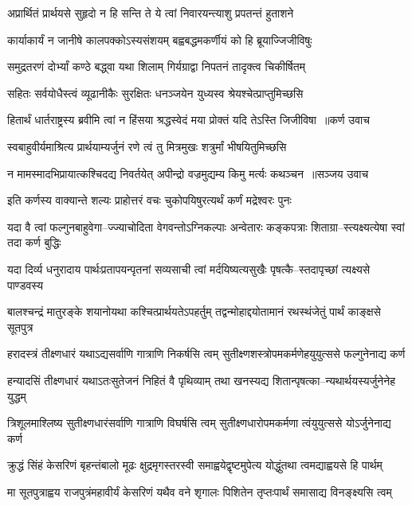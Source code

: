 \twolineshloka
{अप्रार्थितं प्रार्थयसे सुहृदो न हि सन्ति ते}
{ये त्वां निवारयन्त्याशु प्रपतन्तं हुताशने}


\twolineshloka
{कार्याकार्यं न जानीषे कालपक्कोऽस्यसंशयम्}
{बह्वबद्धमकर्णीयं को हि ब्रूयाज्जिजीविषुः}


\twolineshloka
{समुद्रतरणं दोर्भ्यां कण्ठे बद्ध्वा यथा शिलाम्}
{गिर्यग्राद्वा निपतनं तादृक्त्व चिकीर्षितम्}


\twolineshloka
{सहितः सर्वयोधैस्त्वं व्यूढानीकैः सुरक्षितः}
{धनञ्जयेन युध्यस्व श्रेयश्चेत्प्राप्तुमिच्छसि}


\threelineshloka
{हितार्थं धार्तराष्ट्रस्य ब्रवीमि त्वां न हिंसया}
{श्रद्धस्वेदं मया प्रोक्तं यदि तेऽस्ति जिजीविषा ॥कर्ण उवाच}
{}


\twolineshloka
{स्वबाहुवीर्यमाश्रित्य प्रार्थयाम्यर्जुनं रणे}
{त्वं तु मित्रमुखः शत्रुर्मां भीषयितुमिच्छसि}


\threelineshloka
{न मामस्मादभिप्रायात्कश्चिदद्य निवर्तयेत्}
{अपीन्द्रो वज्रमुद्यम्य किमु मर्त्यः कथञ्चन ॥सञ्जय उवाच}
{}


\twolineshloka
{इति कर्णस्य वाक्यान्ते शल्यः प्राहोत्तरं वचः}
{चुकोपयिषुरत्यर्थं कर्णं मद्रेश्वरः पुनः}


\twolineshloka
{यदा वै त्वां फल्गुनबाहुवेगा--ज्ज्याचोदिता वेगवन्तोऽग्निकल्पाः}
{अन्वेतारः कङ्कपत्राः शिताग्रा--स्त्यक्ष्यत्येषा स्वां तदा कर्ण बुद्धिः}


\twolineshloka
{यदा दिर्व्य धनुरादाय पार्थःप्रतापयन्पृतनां सव्यसाची}
{त्वां मर्दयिष्यत्यसुखैः पृषत्कै--स्तदापृच्छां त्यक्ष्यसे पाण्डवस्य}


\twolineshloka
{बालश्चन्द्रं मातुरङ्के शयानोयथा कश्चित्प्रार्थयतेऽपहर्तुम्}
{तद्वन्मोहाद्दयोतामानं रथस्थंजेतुं पार्थं काङ्क्षसे सूतपुत्र}


\twolineshloka
{हरादस्त्रं तीक्ष्णधारं यथाऽद्यसर्वाणि गात्राणि निकर्षसि त्वम्}
{सुतीक्ष्णशस्त्रोपमकर्मणेहयुयुत्ससे फल्गुनेनाद्य कर्ण}


\twolineshloka
{हन्यादसिं तीक्ष्णधारं यथाऽतःसुतेजनं निहितं वै पृथिव्याम्}
{तथा खनस्यद्य शितान्पृषत्का--न्यथार्थयस्यर्जुनेनेह युद्धम्}


\twolineshloka
{त्रिशूलमाश्लिष्य सुतीक्ष्णधारंसर्वाणि गात्राणि विघर्षसि त्वम्}
{सुतीक्ष्णधारोपमकर्मणा त्वंयुयुत्ससे योऽर्जुनेनाद्य कर्ण}


\twolineshloka
{क्रुद्धं सिंहं केसरिणं बृहन्तंबालो मूढः क्षुद्रमृगस्तरस्वी}
{समाह्वयेद्वृष्टमुपेत्य योद्धुंतथा त्वमद्याह्वयसे हि पार्थम्}


\twolineshloka
{मा सूतपुत्राह्वय राजपुत्रंमहावीर्यं केसरिणं यथैव}
{वने शृगालः पिशितेन तृप्तःपार्थं समासाद्य विनङ्क्ष्यसि त्वम्}


